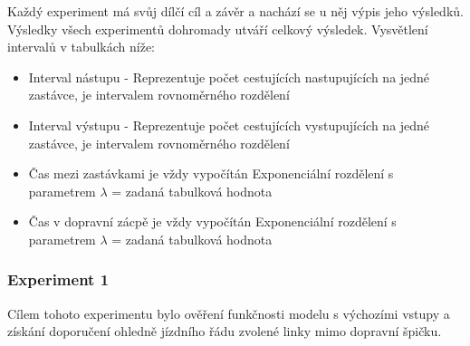 \documentclass[a4paper]{article}
\begin{document}
            Každý experiment má svůj dílčí cíl a závěr a nachází se u něj výpis jeho výsledků. Výsledky všech experimentů dohromady utváří celkový výsledek. Vysvětlení intervalů v tabulkách níže:
            \begin{itemize}
            	\item Interval nástupu - Reprezentuje počet cestujících nastupujících na jedné zastávce, je intervalem rovnoměrného rozdělení 
            	
            	\item Interval výstupu - Reprezentuje počet cestujících vystupujících na jedné zastávce, je intervalem rovnoměrného rozdělení 
            	
            	\item Čas mezi zastávkami je vždy vypočítán Exponenciální rozdělení s parametrem $\lambda$ = zadaná tabulková hodnota 
            	
            	\item Čas v dopravní zácpě je vždy vypočítán Exponenciální rozdělení s parametrem $\lambda$ = zadaná tabulková hodnota 
            \end{itemize}
			\newpage
            \subsubsection{Experiment 1}
            \label{subsubsec:experiment1}

                Cílem tohoto experimentu bylo ověření funkčnosti modelu s výchozími vstupy a získání doporučení ohledně jízdního řádu zvolené linky mimo dopravní špičku.

                \begin{table}[H]
                    \centering
                    \caption{Výsledek experimentu 1}
                    \label{tab:experiment1}
                \end{table}
\end{document}
